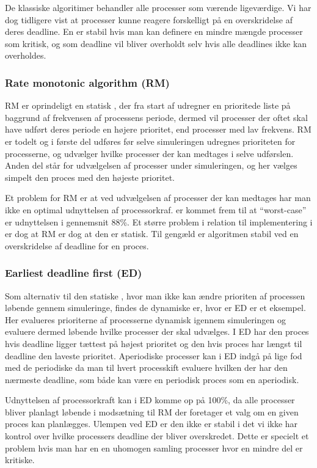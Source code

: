 De klassiske algoritimer behandler alle processer som værende ligeværdige. Vi har dog tidligere vist at processer kunne reagere forskelligt på en overskridelse af deres deadline. En \sched er stabil hvis man kan definere en mindre mængde processer som kritisk, og som deadline vil bliver overholdt selv hvis alle deadlines ikke kan overholdes.

\subsubsection{Rate monotonic algorithm (RM)}
RM er oprindeligt en statisk \sched, der fra start af udregner en prioritede liste på baggrund af frekvensen af processens periode, dermed vil processer der oftet skal have udført deres periode en højere prioritet, end processer med lav frekvens. RM er todelt og i første del udføres før selve simuleringen udregnes  prioriteten for processerne, og udvælger hvilke processer der kan medtages i selve udførslen. Anden del står for udvælgelsen af processer  under simuleringen, og her vælges simpelt den proces med den højeste prioritet. 

 Et problem for RM er at ved udvælgelsen af processer der kan medtages har man ikke en optimal udnyttelsen af processorkraf.  er kommet frem til at ``worst-case'' er udnyttelsen i gennemsnit 88\%\cite{lehoczky1989rate}. Et større problem i relation til implementering i \pycsp er dog at RM er dog at den er statisk. Til gengæld er algoritmen stabil ved en overskridelse af deadline for en proces. 

\subsubsection{Earliest deadline first (ED)}
Som alternativ til den statiske \sched, hvor man ikke kan ændre prioriten af processen løbende gennem simuleringe, findes de dynamiske \sched er, hvor er ED er et eksempel. Her evalueres prioriterne af processerne dynamisk igennem simuleringen og evaluere dermed løbende hvilke processer der skal udvælges. I ED har den proces hvis deadline ligger tættest på højest prioritet og den hvis proces har længst til deadline den laveste prioritet. Aperiodiske processer kan i ED indgå på lige fod med de periodiske da man til hvert processkift evaluere hvilken der har den nærmeste deadline, som både kan være en periodisk proces som en aperiodisk.

Udnyttelsen af processorkraft kan i ED komme op på 100\%, da alle processer bliver planlagt løbende i modsætning til RM der foretager et valg om en given proces kan planlægges.  Ulempen ved ED er den ikke er stabil i det vi ikke har kontrol over hvilke processers deadline der bliver overskredet. Dette er specielt et problem hvis man har en en uhomogen samling processer hvor en mindre del er kritiske.

